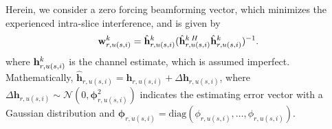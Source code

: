 \documentclass[lettersize,journal]{IEEEtran}
\begin{document}

 Herein, we consider a zero forcing beamforming vector, which minimizes the experienced intra-slice interference, and is given by \cite{huang2013user}
\begin{equation}
\bold{w}_{r,u(s,i)}^{k} = \hat{\bold{h}}_{r,u(s,i)}^{k}(\hat{\bold{h}}_{r,u(s,i)}^{k \: H} \hat{\bold{h}}_{r,u(s,i)}^{k})^{-1}.
\end{equation}
\noindent where $\bold{h}_{r,u(s,i)}^{k}$ is the channel estimate, which is assumed imperfect. Mathematically,
$\hat{\boldsymbol{h}}_{r,u(s,i)} = \boldsymbol{h}_{r,u(s,i)} + \Delta \boldsymbol{h}_{r,u(s,i)}$, where
$\Delta \boldsymbol{h}_{r,u(s,i)}\sim \mathcal{N}(0,\boldsymbol{\phi}_{r,u(s,i)}^2)$ indicates the estimating error vector with a Gaussian distribution and $\boldsymbol{\phi}_{r,u(s,i)} = \text{diag}(\phi_{r,u(s,i)},\ldots,\phi_{r,u(s,i)}).$
\vspace*{-.8em}
\end{document}
